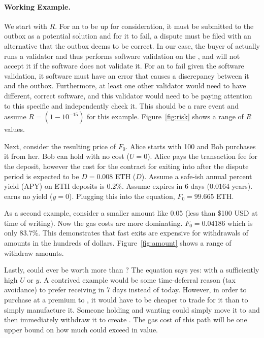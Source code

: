 \paragraph*{Working Example.} We start with $R$. For an \rblock to be up for consideration, it must be submitted to the outbox as a potential solution and for it to fail, a dispute must be filed with an alternative \rblock that the \layerone outbox deems to be correct. In our case, the buyer of \ethxx actually runs a \layertwo validator and thus performs software validation on the \rblock, and will not accept it if the software does not validate it. For an \rblock to fail given the software validation, it software must have an error that causes a discrepancy between it and the \layerone outbox. Furthermore, at least one other validator would need to have different, correct software, and this validator would need to be paying attention to this specific \rblock and independently check it. This should be a rare event and assume $R=(1-10^{-15})$ for this example. Figure~\ref{fig:risk} shows a range of $R$ values.




 Next, consider the resulting price of $F_0$. Alice starts with 100 \ethxx and Bob purchases it from her. Bob can hold \ethxx with no cost ($U=0$). Alice pays the transaction fee for the deposit, however the cost for the contract for exiting \ethxx into \ethone after the dispute period is expected to be $D=0.008$ ETH ($D$). Assume a safe-ish annual percent yield (APY) on ETH deposits is 0.2\%. Assume \ethxx expires in 6 days (0.0164 years). \ethxx earns no yield ($y=0$). Plugging this into the equation, $F_0=99.665$ ETH.

As a second example, consider a smaller amount like 0.05 \ethxx (less than \$100 USD at time of writing). Now the gas costs are more dominating. $F_0=0.04186$ \ethone which is only 83.7\%. This demonstrates that fast exits are expensive for withdrawals of amounts in the hundreds of dollars. Figure~\ref{fig:amount} shows a range of withdraw amounts.

Lastly, could \ethxx ever be worth more than \ethone? The equation says yes: with a sufficiently high $U$ or $y$. A contrived example would be some time-deferral reason (\eg tax avoidance) to prefer receiving \ethone in 7 days instead of today. However, in order to purchase \ethxx at a premium to \ethone, it would have to be cheaper to trade for it than to simply manufacture it. Someone holding \ethone and wanting \ethxx could simply move it to \layertwo and then immediately withdraw it to create \ethxx. The gas cost of this path will be one upper bound on how much \ethxx could exceed \ethone in value. 

